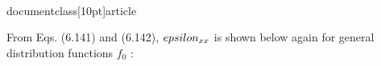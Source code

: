 \\documentclass[10pt]{article}
\begin{document}
{{{{{{From Eqs. (6.141) and (6.142), $\\epsilon_{x x}$ is shown below again for general distribution functions $f_{0}$ :

\\[
\\begin{array}{r}
\\epsilon_{x x}=\\left(1-\\frac{\\omega_{p}^{2}}{\\omega^{2}}\\right)-\\frac{\\omega_{p}^{2}}{\\omega^{2}} \\sum_{n=-\\infty}^{+\\infty} 2 \\pi \\int_{0}^{\\infty} d v_{\\perp} v_{\\perp} \\int_{-\\infty}^{\\infty} d v_{\\|} \\\\
\\left(\\frac{n \\Omega}{v_{\\perp}} \\frac{\\partial f_{0}}{\\partial v_{\\perp}}+k_{\\|} \\frac{\\partial f_{0}}{\\partial v_{\\|}}\\right) \\frac{\\left(\\frac{n \\Omega}{k_{\\perp}}\\right)^{2} J_{n}^{2}\\left(\\frac{k_{\\perp} v_{\\perp}}{\\Omega}\\right)}{n \\Omega+k_{\\|} v_{\\|}-\\omega} \\tag{G.1}
\\end{array}
\\]

}}}}}}
\end{document}
